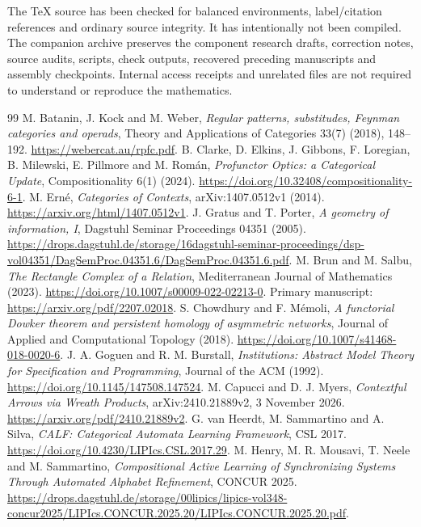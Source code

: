 \documentclass[11pt]{article}
\theoremstyle{definition}\newtheorem{definition}[theorem]{Definition}
\theoremstyle{remark}\newtheorem{remark}[theorem]{Remark}
\begin{document}
The TeX source has been checked for balanced environments, label/citation
references and ordinary source integrity. It has intentionally not been
compiled. The companion archive preserves the component research drafts,
correction notes, source audits, scripts, check outputs, recovered preceding
manuscripts and assembly checkpoints. Internal access receipts and unrelated
files are not required to understand or reproduce the mathematics.


\begin{thebibliography}{99}
 M. Batanin, J. Kock and M. Weber,
\emph{Regular patterns, substitudes, Feynman categories and operads},
Theory and Applications of Categories 33(7) (2018), 148--192.
\url{https://webercat.au/rpfc.pdf}.
 B. Clarke, D. Elkins, J. Gibbons, F. Loregian,
B. Milewski, E. Pillmore and M. Rom\'an,
\emph{Profunctor Optics: a Categorical Update}, Compositionality 6(1) (2024).
\url{https://doi.org/10.32408/compositionality-6-1}.
 M. Ern\'e, \emph{Categories of Contexts},
arXiv:1407.0512v1 (2014).
\url{https://arxiv.org/html/1407.0512v1}.
 J. Gratus and T. Porter, \emph{A geometry of information, I},
Dagstuhl Seminar Proceedings 04351 (2005).
\url{https://drops.dagstuhl.de/storage/16dagstuhl-seminar-proceedings/dsp-vol04351/DagSemProc.04351.6/DagSemProc.04351.6.pdf}.
 M. Brun and M. Salbu, \emph{The Rectangle Complex of a Relation},
Mediterranean Journal of Mathematics (2023).
\url{https://doi.org/10.1007/s00009-022-02213-0}.
Primary manuscript: \url{https://arxiv.org/pdf/2207.02018}.
 S. Chowdhury and F. M\'emoli,
\emph{A functorial Dowker theorem and persistent homology of asymmetric networks},
Journal of Applied and Computational Topology (2018).
\url{https://doi.org/10.1007/s41468-018-0020-6}.
 J. A. Goguen and R. M. Burstall,
\emph{Institutions: Abstract Model Theory for Specification and Programming},
Journal of the ACM (1992).
\url{https://doi.org/10.1145/147508.147524}.
 M. Capucci and D. J. Myers,
\emph{Contextful Arrows via Wreath Products}, arXiv:2410.21889v2,
3 November 2026.
\url{https://arxiv.org/pdf/2410.21889v2}.
 G. van Heerdt, M. Sammartino and A. Silva,
\emph{CALF: Categorical Automata Learning Framework}, CSL 2017.
\url{https://doi.org/10.4230/LIPIcs.CSL.2017.29}.
 M. Henry, M. R. Mousavi, T. Neele and M. Sammartino,
\emph{Compositional Active Learning of Synchronizing Systems Through
Automated Alphabet Refinement}, CONCUR 2025.
\url{https://drops.dagstuhl.de/storage/00lipics/lipics-vol348-concur2025/LIPIcs.CONCUR.2025.20/LIPIcs.CONCUR.2025.20.pdf}.

\end{thebibliography}
\end{document}
